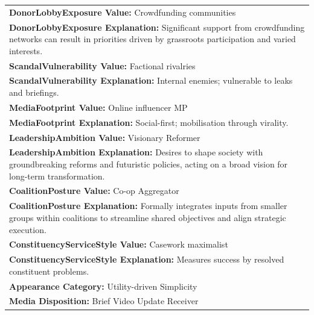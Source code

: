 \documentclass[11pt]{article}
\begin{document}
\begin{table}[ht]
\begin{tabularx}{\textwidth}{X}
\textbf{DonorLobbyExposure Value:} Crowdfunding communities \\
\textbf{DonorLobbyExposure Explanation:} Significant support from crowdfunding networks can result in priorities driven by grassroots participation and varied interests. \\[4pt]

\textbf{ScandalVulnerability Value:} Factional rivalries \\
\textbf{ScandalVulnerability Explanation:} Internal enemies; vulnerable to leaks and briefings. \\[4pt]

\textbf{MediaFootprint Value:} Online influencer MP \\
\textbf{MediaFootprint Explanation:} Social-first; mobilisation through virality. \\[4pt]

\textbf{LeadershipAmbition Value:} Visionary Reformer \\
\textbf{LeadershipAmbition Explanation:} Desires to shape society with groundbreaking reforms and futuristic policies, acting on a broad vision for long-term transformation. \\[4pt]

\textbf{CoalitionPosture Value:} Co-op Aggregator \\
\textbf{CoalitionPosture Explanation:} Formally integrates inputs from smaller groups within coalitions to streamline shared objectives and align strategic execution. \\[4pt]

\textbf{ConstituencyServiceStyle Value:} Casework maximalist \\
\textbf{ConstituencyServiceStyle Explanation:} Measures success by resolved constituent problems. \\[4pt]

\textbf{Appearance Category:} Utility-driven Simplicity \\
\textbf{Media Disposition:} Brief Video Update Receiver \\[4pt]


\end{tabularx}
\end{table}
\end{document}
